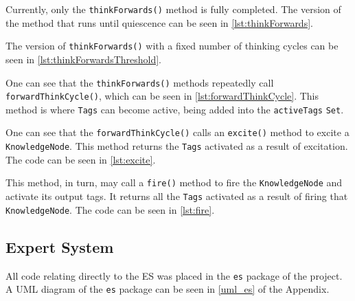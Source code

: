 \documentclass[titlepage,11pt]{article}
\def \knnpath {"C:/Users/Sean/IdeaProjects/Prometheus/src/knn/KnowledgeNodeNetwork.java"}
\newcommand{\code}[1]{\texttt{#1}}
\begin{document}
Currently, only the \code{thinkForwards()} method is fully completed. The version of the method that runs until quiescence can be seen in \autoref{lst:thinkForwards}.



The version of \code{thinkForwards()} with a fixed number of thinking cycles can be seen in \autoref{lst:thinkForwardsThreshold}.



One can see that the \code{thinkForwards()} methods repeatedly call \code{forwardThinkCycle()}, which can be seen in \autoref{lst:forwardThinkCycle}. This method is where \code{Tags} can become active, being added into the \code{activeTags} \code{Set}.



One can see that the \code{forwardThinkCycle()} calls an \code{excite()} method to excite a \code{KnowledgeNode}. This method returns the \code{Tags} activated as a result of excitation. The code can be seen in \autoref{lst:excite}.



This method, in turn, may call a \code{fire()} method to fire the \code{KnowledgeNode} and activate its output tags. It returns all the \code{Tags} activated as a result of firing that \code{KnowledgeNode}. The code can be seen in \autoref{lst:fire}.



\subsection{Expert System}

All code relating directly to the ES was placed in the \code{es} package of the project. A UML diagram of the \code{es} package can be seen in \autoref{uml_es} of the Appendix.
\end{document}
